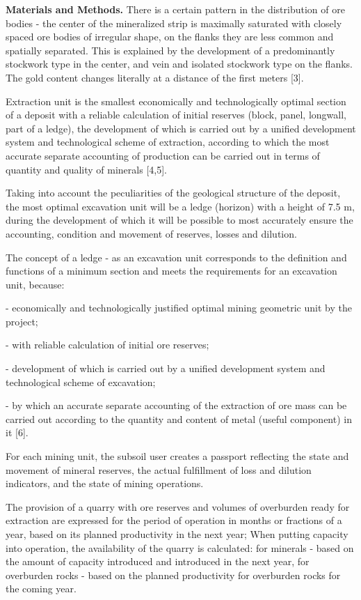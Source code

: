 {\bfseries Materials and Methods.} There is a certain pattern in the
distribution of ore bodies - the center of the mineralized strip is
maximally saturated with closely spaced ore bodies of irregular shape,
on the flanks they are less common and spatially separated. This is
explained by the development of a predominantly stockwork type in the
center, and vein and isolated stockwork type on the flanks. The gold
content changes literally at a distance of the first meters {[}3{]}.

Extraction unit is the smallest economically and technologically optimal
section of a deposit with a reliable calculation of initial reserves
(block, panel, longwall, part of a ledge), the development of which is
carried out by a unified development system and technological scheme of
extraction, according to which the most accurate separate accounting of
production can be carried out in terms of quantity and quality of
minerals {[}4,5{]}.

Taking into account the peculiarities of the geological structure of the
deposit, the most optimal excavation unit will be a ledge (horizon) with
a height of 7.5 m, during the development of which it will be possible
to most accurately ensure the accounting, condition and movement of
reserves, losses and dilution.

The concept of a ledge - as an excavation unit corresponds to the
definition and functions of a minimum section and meets the requirements
for an excavation unit, because:

- economically and technologically justified optimal mining geometric
unit by the project;

- with reliable calculation of initial ore reserves;

- development of which is carried out by a unified development system
and technological scheme of excavation;

- by which an accurate separate accounting of the extraction of ore mass
can be carried out according to the quantity and content of metal
(useful component) in it {[}6{]}.

For each mining unit, the subsoil user creates a passport reflecting the
state and movement of mineral reserves, the actual fulfillment of loss
and dilution indicators, and the state of mining operations.

The provision of a quarry with ore reserves and volumes of overburden
ready for extraction are expressed for the period of operation in months
or fractions of a year, based on its planned productivity in the next
year; When putting capacity into operation, the availability of the
quarry is calculated: for minerals - based on the amount of capacity
introduced and introduced in the next year, for overburden rocks - based
on the planned productivity for overburden rocks for the coming year.

